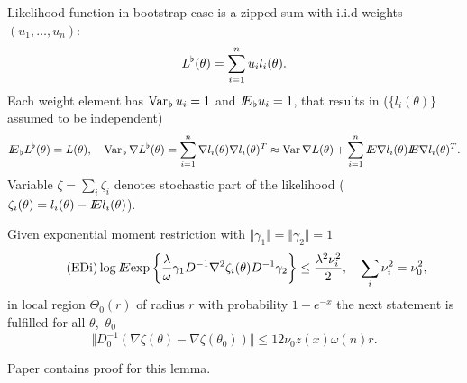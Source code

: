 Likelihood function in bootstrap case is a zipped sum with i.i.d weights $(u_1,\ldots,u_n)$:
\[
L^{\flat}(\theta) = \sum_{i=1}^n u_i l_i(\theta). 
\]  
Each weight element has $\operatorname{Var}_{\hspace{1pt} \flat} u_i = 1$ and $I\!\!E_{\hspace{1pt} \flat} u_i = 1$, that results in ($\{l_i(\theta)\}$ assumed to be independent)
\[
I\!\!E_{\hspace{1pt} \flat} L^{\flat}(\theta) = L(\theta),
\quad
\operatorname{Var}_{\hspace{1pt} \flat} \nabla L^{\flat}(\theta)  =  \sum_{i=1}^n \nabla l_i(\theta) \nabla l_i(\theta)^{T} \approx \operatorname{Var} \nabla L(\theta) +  \sum_{i=1}^n I\!\!E \nabla l_i(\theta) I\!\!E \nabla l_i(\theta)^{T} . 
\]
Variable $\zeta = \sum_i \zeta_i$ denotes stochastic part of the likelihood ($\zeta_i(\theta) = l_i(\theta) - I\!\!E l_i(\theta)$). 

\begin{lemma} 
Given exponential moment restriction with  $\Vert \gamma_1 \Vert = \Vert \gamma_2 \Vert = 1$ 
\begin{equation*}\label{EDi}\tag{EDi}
\log I\!\!E \text{exp} \left\{
\frac{\lambda}{\omega} \gamma_1 D^{-1}  \nabla^2 \zeta_i (\theta) D^{-1} \gamma_2 
\right\}
\leq \frac{\lambda^2 \nu_i^2}{2}, 
\quad \sum_i  \nu_i^2  = \nu_0^2,
\end{equation*} 
in local region $\Theta_0(r)$ of radius $r$ with probability $1- e^{-x}$ the next statement is fulfilled  for all $\theta$,~$\theta_0$ 
\[
\Vert D_0^{-1} (\nabla \zeta (\theta) -  \nabla \zeta (\theta_0))  \Vert
\leq 12 \nu_0 z(x) \omega(n) r.
\]
\end{lemma}
Paper \citep{wilks2013} contains proof for this lemma. 

